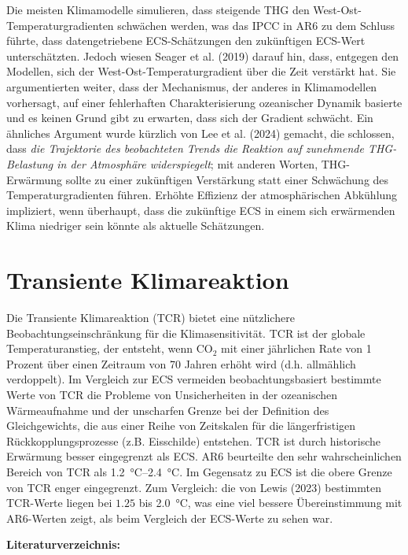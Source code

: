 \documentclass[12pt,paper=a4,DIV=12,parskip=never,chapterprefix=false,headings=standardclasses]{scrreprt}
\begin{document}
Die meisten Klimamodelle simulieren, dass steigende THG den West-Ost-Temperatur\-gradienten schwächen werden, was das IPCC in AR6 zu dem Schluss führte, dass datengetriebene ECS-Schätzungen den zukünftigen ECS-Wert unterschätzten. Jedoch wiesen Seager et al. (2019) darauf hin, dass, entgegen den Modellen, sich der West-Ost-Temperaturgradient über die Zeit verstärkt hat. Sie argumentierten weiter, dass der Mechanismus, der anderes in Klimamodellen vorhersagt, auf einer fehlerhaften Charakterisierung ozeanischer Dynamik basierte und es keinen Grund gibt zu erwarten, dass sich der Gradient schwächt. Ein ähnliches Argument wurde kürzlich von Lee et al. (2024) gemacht, die schlossen, dass \emph{die Trajektorie des beobachteten Trends die Reaktion auf zunehmende THG-Belastung in der Atmosphäre widerspiegelt}; mit anderen Worten, THG-Erwärmung sollte zu einer zukünftigen Verstärkung statt einer Schwächung des Temperaturgradienten führen. Erhöhte Effizienz der atmosphärischen Abkühlung impliziert, wenn überhaupt, dass die zukünftige ECS in einem sich erwärmenden Klima niedriger sein könnte als aktuelle Schätzungen.

\section{Transiente Klimareaktion}
Die Transiente Klimareaktion (TCR) bietet eine nützlichere Beobachtungseinschränkung für die Klimasensitivität. TCR ist der globale Temperaturanstieg, der entsteht, wenn CO$_2$ mit einer jährlichen Rate von 1 Prozent über einen Zeitraum von 70 Jahren erhöht wird (d.h. allmählich verdoppelt). Im Vergleich zur ECS vermeiden beobachtungsbasiert bestimmte Werte von TCR die Probleme von Unsicherheiten in der ozeanischen Wärmeaufnahme und der unscharfen Grenze bei der Definition des Gleichgewichts, die aus einer Reihe von Zeitskalen für die längerfristigen Rückkopplungsprozesse (z.B. Eisschilde) entstehen. TCR ist durch historische Erwärmung besser eingegrenzt als ECS. AR6 beurteilte den sehr wahrscheinlichen Bereich von TCR als \SIrange{1.2}{2.4}{\celsius}. Im Gegensatz zu ECS ist die obere Grenze von TCR enger eingegrenzt. Zum Vergleich: die von Lewis (2023) bestimmten TCR-Werte liegen bei $1.25$ bis \SI{2.0}{\celsius}, was eine viel bessere Übereinstimmung mit AR6-Werten zeigt, als beim Vergleich der ECS-Werte zu sehen war.

\vfill
\noindent\textbf{Literaturverzeichnis:}

\begingroup
\parindent=0pt
\everypar{\hangindent=2em\hangafter=1\relax}
\end{document}
